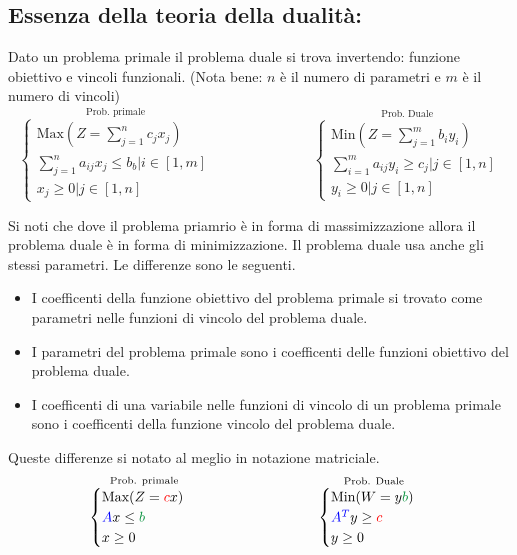 \documentclass{article}
\begin{document}
\subsection{Essenza della teoria della dualità:}
Dato un problema primale il problema duale si trova invertendo: funzione obiettivo e vincoli funzionali. (Nota bene: $n$ è il numero di parametri e $m$ è il numero di vincoli)
$$
  \overset{\text{Prob. primale}}{
    \begin{cases}
      \text{Max}(Z=\sum_{j=1}^{n}c_jx_j)        \\
      \sum_{j=1}^{n}a_{ij}x_j\le b_b|i\in [1,m] \\
      x_j\ge 0|j\in [1,n]
    \end{cases}
  }
  \hspace{3cm}
  \overset{\text{Prob. Duale}}{
    \begin{cases}
      \text{Min}(Z=\sum_{j=1}^{m}b_iy_i)        \\
      \sum_{i=1}^{m}a_{ij}y_i\ge c_j|j\in [1,n] \\
      y_i\ge 0|j\in [1,n]
    \end{cases}
  }
$$

Si noti che dove il problema priamrio è in forma di massimizzazione allora il problema duale è in forma di minimizzazione. Il problema duale usa anche gli stessi parametri. Le differenze sono le seguenti.
\begin{itemize}
  \item I coefficenti della funzione obiettivo del problema primale si trovato come parametri nelle funzioni di vincolo del problema duale.
  \item I parametri del problema primale sono i coefficenti delle funzioni obiettivo del problema duale.
  \item I coefficenti di una variabile nelle funzioni di vincolo di un problema primale sono i coefficenti della funzione vincolo del problema duale.
\end{itemize}

Queste differenze si notato al meglio in notazione matriciale.
$$
  \overset{\text{Prob. primale}}{
    \begin{cases}
      \text{Max}(Z=\textcolor{red}{c}x)                 \\
      \textcolor{blue}{A}x \le \textcolor{darkgreen}{b} \\
      x \ge 0
    \end{cases}
  }
  \hspace{3cm}
  \overset{\text{Prob. Duale}}{
    \begin{cases}
      \text{Min}(W=y\textcolor{darkgreen}{b})         \\
      \textcolor{blue}{A^{T}}y \ge \textcolor{red}{c} \\
      y \ge 0
    \end{cases}
  }
$$
\end{document}
